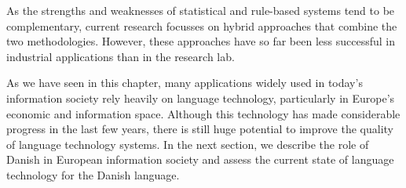 \begin{multicols}{2}

As the strengths and weaknesses of statistical and rule-based systems tend to be complementary, current research focusses on hybrid approaches that combine the two methodologies. However, these approaches have so far been less successful in industrial applications than in the research lab. 

As we have seen in this chapter, many applications widely used in today’s information society rely heavily on language technology, particularly in Europe’s economic and information space. Although this technology has made considerable progress in the last few years, there is still huge potential to improve the quality of language technology systems. In the next section, we describe the role of Danish in European information society and assess the current state of language technology for the Danish language.
\end{multicols}

\clearpage



